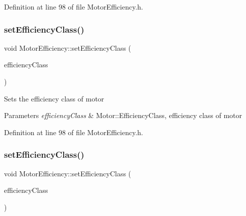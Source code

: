 Definition at line 98 of file Motor\+Efficiency.\+h.

\mbox{\label{class_motor_efficiency_a1ff4790d01bf2e65bd7bce2edc98d0c5}} 
\subsubsection{\texorpdfstring{set\+Efficiency\+Class()}{setEfficiencyClass()}\hspace{0.1cm}{\footnotesize\ttfamily [2/3]}}
{\footnotesize\ttfamily void Motor\+Efficiency\+::set\+Efficiency\+Class (\begin{DoxyParamCaption}\item[{Motor\+::\+Efficiency\+Class}]{efficiency\+Class }\end{DoxyParamCaption})\hspace{0.3cm}{\ttfamily [inline]}}

Sets the efficiency class of motor 
\begin{DoxyParams}{Parameters}
{\em efficiency\+Class} & Motor\+::\+Efficiency\+Class, efficiency class of motor \\
\hline
\end{DoxyParams}


Definition at line 98 of file Motor\+Efficiency.\+h.

\mbox{\label{class_motor_efficiency_a1ff4790d01bf2e65bd7bce2edc98d0c5}} 
\subsubsection{\texorpdfstring{set\+Efficiency\+Class()}{setEfficiencyClass()}\hspace{0.1cm}{\footnotesize\ttfamily [3/3]}}
{\footnotesize\ttfamily void Motor\+Efficiency\+::set\+Efficiency\+Class (\begin{DoxyParamCaption}\item[{Motor\+::\+Efficiency\+Class}]{efficiency\+Class }\end{DoxyParamCaption})\hspace{0.3cm}{\ttfamily [inline]}}

